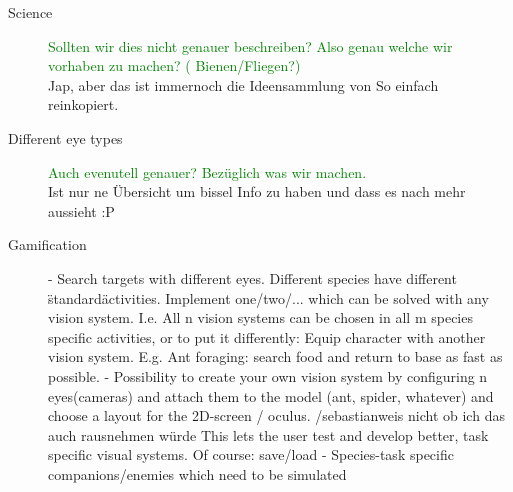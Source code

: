 \documentclass{acm_proc_article-sp}
\newcommand{\sebastian}[1]{\textcolor{Green}{#1}}
\newcommand{\stefan}[1]{\textcolor{BurntOrange}{#1}}
\begin{document}
\begin{description}
  \item[Science]
  \sebastian{Sollten wir dies nicht genauer beschreiben? Also genau welche wir
  vorhaben zu machen? ( Bienen/Fliegen?)}\\
  \stefan{Jap, aber das ist immernoch die Ideensammlung von So einfach
  reinkopiert.}

\item[Different eye types]
\sebastian{Auch evenutell genauer? Bezüglich was wir machen.}\\
\stefan{Ist nur ne Übersicht um bissel Info zu haben und dass es nach mehr
aussieht :P}

\item[Gamification]
- Search targets with different eyes. Different species have different
  \"standard\" activities.
  Implement one/two/... which can be solved with any vision system.
  I.e. All n vision systems can be chosen in all m species specific activities,
  or to put it differently: Equip character with another vision system.
  E.g. Ant foraging: search food and return to base as fast as possible.
- Possibility to create your own vision system by configuring n eyes(cameras)
  and attach them to the model (ant, spider, whatever) and choose a layout
  for the 2D-screen / oculus.
  /sebastian{weis nicht ob ich das auch rausnehmen würde}
  This lets the user test and develop better, task specific visual systems.
  Of course: save/load
- Species-task specific companions/enemies which need to be simulated


\end{description}
\end{document}
